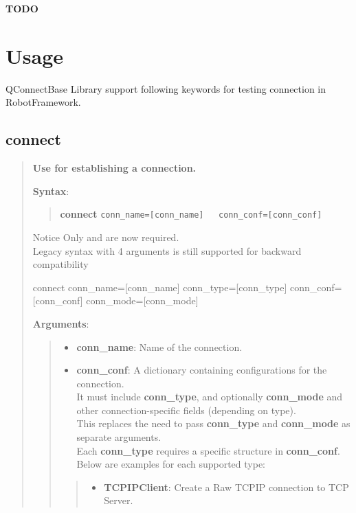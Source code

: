 \textbf{TODO}



\hypertarget{description-usage}{%
\section{Usage}\label{description-usage}}

QConnectBase Library support following keywords for testing connection
in RobotFramework.

\hypertarget{description-connect}{%
\subsection{\texorpdfstring{\textbf{connect}}{connect}}\label{description-connect}}

\begin{quote}
\textbf{Use for establishing a connection.}

\textbf{Syntax}:

\begin{quote}
\textbf{connect}
\texttt{conn\_name={[}conn\_name{]}\ \ \ conn\_conf={[}conn\_conf{]}}
\end{quote}

\begin{boxhint} {Notice}
Only  and  are now required.\\

Legacy syntax with 4 arguments is still supported for backward compatibility
\begin{robotcode}
connect   conn_name=[conn_name]   conn_type=[conn_type]   conn_conf=[conn_conf]   conn_mode=[conn_mode]
\end{robotcode}
\end{boxhint}

\textbf{Arguments}:

\begin{quote}
\begin{itemize}
  \item \textbf{conn\_name}: Name of the connection.

  \item \textbf{conn\_conf}: A dictionary containing configurations for the connection.\\
         It must include \textbf{conn\_type}, and optionally \textbf{conn\_mode} and other connection-specific fields (depending on type).\\
         This replaces the need to pass \textbf{conn\_type} and \textbf{conn\_mode} as separate arguments.\\
         Each \textbf{conn\_type} requires a specific structure in \textbf{conn\_conf}.\\
         \newpage
         Below are examples for each supported type:
\end{itemize}
\begin{quote}
\begin{itemize}
\tightlist
\item
  \textbf{TCPIPClient}: Create a Raw TCPIP connection to TCP Server.
\end{itemize}



\end{quote}
\end{quote}
\end{quote}
